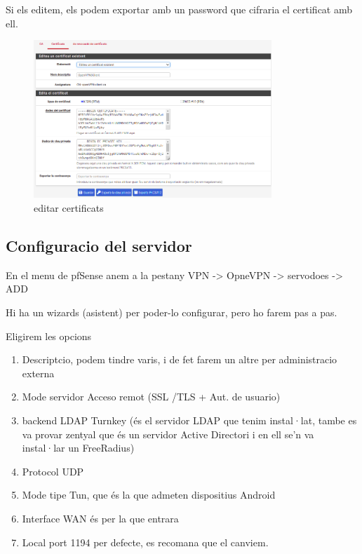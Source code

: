 \documentclass[
  10pt,
]{krantz}
\providecommand{\tightlist}{%
  \setlength{\itemsep}{0pt}\setlength{\parskip}{0pt}}
\begin{document}
Si els editem, els podem exportar amb un password que cifraria el certificat amb ell.

\begin{figure}
\centering
\includegraphics[width=0.8\textwidth,height=\textheight]{imatges/proxmox/Edit_cert.png}
\caption{editar certificats}
\end{figure}

\hypertarget{configuracio-del-servidor}{%
\subsection{Configuracio del servidor}\label{configuracio-del-servidor}}

En el menu de pfSense anem a la pestany VPN -\textgreater{} OpneVPN -\textgreater{} servodoes -\textgreater{} ADD

Hi ha un wizards (asistent) per poder-lo configurar, pero ho farem pas a pas.

Eligirem les opcions

\begin{enumerate}
\def\labelenumi{\arabic{enumi}.}
\tightlist
\item
  Descriptcio, podem tindre varis, i de fet farem un altre per administracio externa
\item
  Mode servidor Acceso remot (SSL /TLS + Aut. de usuario)
\item
  backend LDAP Turnkey (és el servidor LDAP que tenim instal·lat, tambe es va provar zentyal que és un servidor Active Directori i en ell se'n va instal·lar un FreeRadius)
\item
  Protocol UDP
\item
  Mode tipe Tun, que és la que admeten dispositius Android
\item
  Interface WAN és per la que entrara
\item
  Local port 1194 per defecte, es recomana que el canviem.
\end{enumerate}
\end{document}
